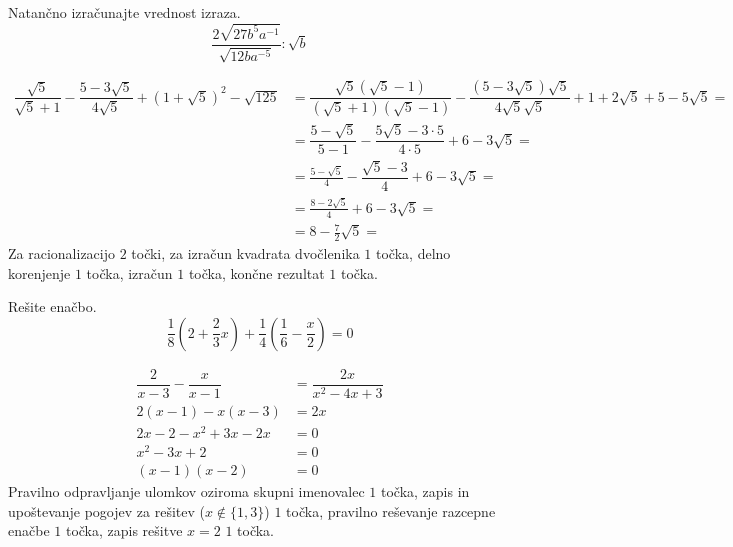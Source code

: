 \documentclass[addpoints]{exam}
\begin{document}
\begin{questions}


    \question[5]
    Natančno izračunajte vrednost izraza.
    $$ \dfrac{2\sqrt{27b^5a^{-1}}}{\sqrt{12ba^{-5}}}:\sqrt{b} $$

    \begin{solution}[7cm]
        \begin{align*} 
            \dfrac{\sqrt{5}}{\sqrt{5}+1}-\dfrac{5-3\sqrt{5}}{4\sqrt{5}}+\left(1+\sqrt{5}\right)^2-\sqrt{125}&=\dfrac{\sqrt{5}(\sqrt{5}-1)}{(\sqrt{5}+1)(\sqrt{5}-1)}-\dfrac{(5-3\sqrt{5})\sqrt{5}}{4\sqrt{5}\sqrt{5}}+1+2\sqrt{5}+5-5\sqrt{5}= \\
                                                                                                            &=\dfrac{5-\sqrt{5}}{5-1}-\dfrac{5\sqrt{5}-3\cdot 5}{4\cdot 5}+6-3\sqrt{5}= \\
                                                                                                            &=\frac{5-\sqrt{5}}{4}-\dfrac{\sqrt{5}-3}{4}+6-3\sqrt{5}= \\
                                                                                                            &=\frac{8-2\sqrt{5}}{4}+6-3\sqrt{5}= \\
                                                                                                            &=8-\frac{7}{2}\sqrt{5}= 
        \end{align*}
        Za racionalizacijo $2$ točki, za izračun kvadrata dvočlenika $1$ točka, delno korenjenje $1$ točka, izračun $1$ točka, končne rezultat $1$ točka.
    \end{solution}
    
    

    \question[3]
    Rešite enačbo.
    $$ \dfrac{1}{8}\left(2+\dfrac{2}{3}x\right)+\dfrac{1}{4}\left(\dfrac{1}{6}-\dfrac{x}{2}\right)=0 $$
    
    
    \begin{solution}[4cm]
        \begin{align*} 
            \dfrac{2}{x-3}-\dfrac{x}{x-1} &=\dfrac{2x}{x^2-4x+3} \\
            2(x-1)-x(x-3) &= 2x \\
            2x-2-x^2+3x-2x &=0 \\
            x^2-3x+2 &=0 \\
            (x-1)(x-2) &=0
        \end{align*}
        Pravilno odpravljanje ulomkov oziroma skupni imenovalec $1$ točka, zapis in upoštevanje pogojev za rešitev ($x\notin\{1,3\}$) $1$ točka, pravilno reševanje razcepne enačbe $1$ točka, zapis rešitve $x=2$ $1$ točka.
    \end{solution}


\end{questions}
\end{document}
